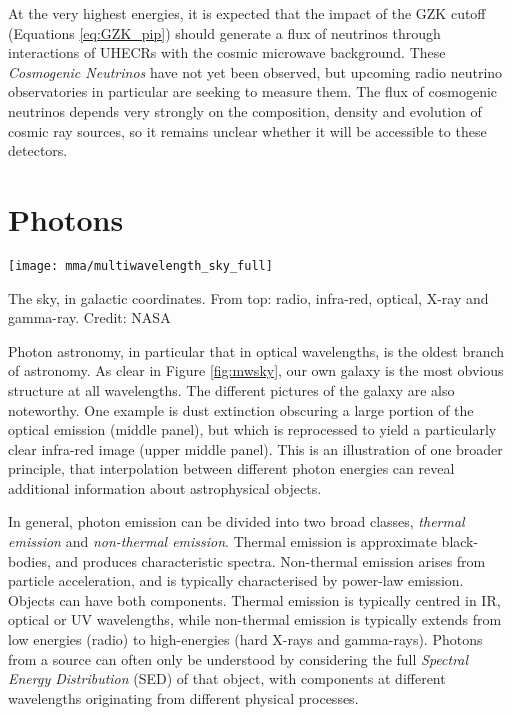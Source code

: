 At the very highest energies, it is expected that the impact of the GZK cutoff (Equations \ref{eq:GZK_pip}) should generate a flux of neutrinos through interactions of UHECRs with the cosmic microwave background. These \emph{Cosmogenic Neutrinos} have not yet been observed, but upcoming radio neutrino observatories in particular are seeking to measure them. The flux of cosmogenic neutrinos depends very strongly on the composition, density and evolution of cosmic ray sources, so it remains unclear whether it will be accessible to these detectors.

\section{Photons}

\begin{marginfigure}
	\texttt{[image: mma/multiwavelength\_sky\_full]}
	\caption{The sky, in galactic coordinates. From top: radio, infra-red, optical, X-ray and gamma-ray. Credit: NASA}
	\label{fig:mwsky}
\end{marginfigure}

Photon astronomy, in particular that in optical wavelengths, is the oldest branch of astronomy. As clear in Figure \ref{fig:mwsky}, our own galaxy is the most obvious structure at all wavelengths. The different pictures of the galaxy are also noteworthy. One example is dust extinction obscuring a large portion of the optical emission (middle panel), but which is reprocessed to yield a particularly clear infra-red image (upper middle panel). This is an illustration of one broader principle, that interpolation between different photon energies can reveal additional information about astrophysical objects.

In general, photon emission can be divided into two broad classes, \emph{thermal emission} and \emph{non-thermal emission}. Thermal emission is approximate black-bodies, and produces characteristic spectra. Non-thermal emission arises from particle acceleration, and is typically characterised by power-law emission. Objects can have both components. Thermal emission is typically centred in IR, optical or UV wavelengths, while non-thermal emission is typically extends from low energies (radio) to high-energies (hard X-rays and gamma-rays). Photons from a source can often only be understood by considering the full \emph{Spectral Energy Distribution} (SED) of that object, with components at different wavelengths originating from different physical processes.
 
